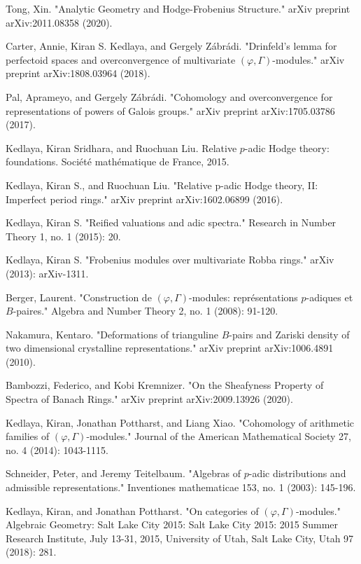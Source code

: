\documentclass[12pt]{amsart}
\theoremstyle{definition}
\numberwithin{equation}{section}
\begin{document}

\begin{thebibliography}{10}
 Tong, Xin. "Analytic Geometry and Hodge-Frobenius Structure." arXiv preprint arXiv:2011.08358 (2020).

 Carter, Annie, Kiran S. Kedlaya, and Gergely Z\'abr\'adi. "Drinfeld's lemma for perfectoid spaces and overconvergence of multivariate $(\varphi,\Gamma)$-modules." arXiv preprint arXiv:1808.03964 (2018).

 Pal, Aprameyo, and Gergely Z\'abr\'adi. "Cohomology and overconvergence for representations of powers of Galois groups." arXiv preprint arXiv:1705.03786 (2017).

 Kedlaya, Kiran Sridhara, and Ruochuan Liu. Relative $p$-adic Hodge theory: foundations. Soci\'et\'e math\'ematique de France, 2015.

 Kedlaya, Kiran S., and Ruochuan Liu. "Relative p-adic Hodge theory, II: Imperfect period rings." arXiv preprint arXiv:1602.06899 (2016).

 Kedlaya, Kiran S. "Reified valuations and adic spectra." Research in Number Theory 1, no. 1 (2015): 20.

 Kedlaya, Kiran S. "Frobenius modules over multivariate Robba rings." arXiv (2013): arXiv-1311.

 Berger, Laurent. "Construction de $(\varphi,\Gamma)$-modules: repr\'esentations $p$-adiques et $B$-paires." Algebra and Number Theory 2, no. 1 (2008): 91-120.

 Nakamura, Kentaro. "Deformations of trianguline $B$-pairs and Zariski density of two dimensional crystalline representations." arXiv preprint arXiv:1006.4891 (2010).

 Bambozzi, Federico, and Kobi Kremnizer. "On the Sheafyness Property of Spectra of Banach Rings." arXiv preprint arXiv:2009.13926 (2020).

 Kedlaya, Kiran, Jonathan Pottharst, and Liang Xiao. "Cohomology of arithmetic families of $(\varphi, \Gamma)$-modules." Journal of the American Mathematical Society 27, no. 4 (2014): 1043-1115.

 Schneider, Peter, and Jeremy Teitelbaum. "Algebras of $p$-adic distributions and admissible representations." Inventiones mathematicae 153, no. 1 (2003): 145-196.


 Kedlaya, Kiran, and Jonathan Pottharst. "On categories of $(\varphi, \Gamma)$-modules." Algebraic Geometry: Salt Lake City 2015: Salt Lake City 2015: 2015 Summer Research Institute, July 13-31, 2015, University of Utah, Salt Lake City, Utah 97 (2018): 281.


\end{thebibliography}
\end{document}
